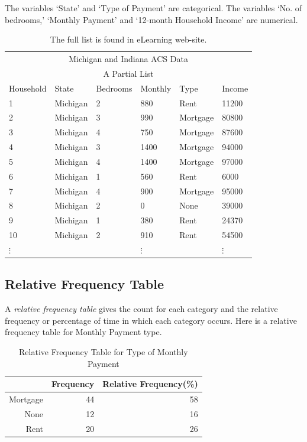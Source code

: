 \documentclass[11pt, chapterprefix=true]{scrbook}\usepackage[]{graphicx}\usepackage[]{color}
\begin{document}
The variables `State' and `Type of Payment' are categorical.  The variables `No. of bedrooms,' `Monthly Payment' and `12-month Household Income' are numerical.

\begin{table}[htbp]
   \centering
   \begin{tabular}{@{} llllll @{}} \hline %
      \multicolumn{6}{c}{Michigan and Indiana ACS Data} \\
      \multicolumn{6}{c}{A Partial List} \\
Household &	State	& Bedrooms	& Monthly	& Type	& Income \\ \hline
1	& Michigan	& 2	& 880	& Rent	& 11200 \\
2	& Michigan	& 3	& 990	& Mortgage	& 80800 \\
3	& Michigan	& 4	& 750	& Mortgage	& 87600 \\
4	& Michigan	& 3	& 1400 &	Mortgage &	94000 \\
5	& Michigan	& 4	& 1400 &	Mortgage &	97000 \\
6	& Michigan	& 1	& 560	& Rent	& 6000 \\
7	& Michigan	& 4	& 900	& Mortgage &	95000 \\
8	& Michigan	& 2	& 0	& None	& 39000 \\
9	& Michigan	& 1	& 380	& Rent	& 24370 \\
10	& Michigan & 2 &	910	& Rent &	54500 \\
$\vdots$ & & & $\vdots$ & &  $\vdots$ \\ \hline
   \end{tabular}
   \caption{The full list is found in eLearning web-site.}
   \label{tab:booktabs}
\end{table}

\subsection{Relative Frequency Table}

A \textit{relative frequency table} gives the count for each category and the relative frequency or percentage of time in which each category occurs.  Here is a relative frequency table for Monthly Payment type.

\begin{table}[ht]
\centering
\begin{tabular}{rrr}
  \hline
 & Frequency & Relative Frequency(\%) \\ 
  \hline
Mortgage & 44 & 58 \\ 
  None & 12 & 16 \\ 
  Rent & 20 & 26 \\ 
   \hline
\end{tabular}
\caption{Relative Frequency Table for Type of Monthly Payment} 
\end{table}
\end{document}
